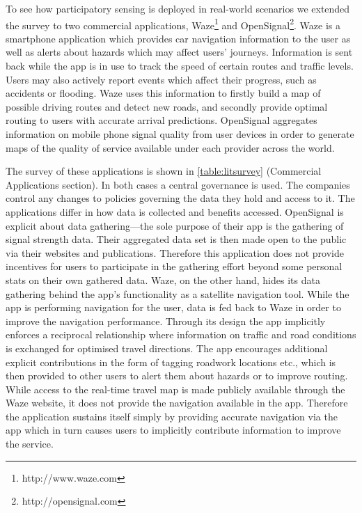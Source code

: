 To see how participatory sensing is deployed in real-world scenarios we extended the survey to two commercial applications, Waze\footnote{http://www.waze.com} and OpenSignal\footnote{http://opensignal.com}. Waze is a smartphone application which provides car navigation information to the user as well as alerts about hazards which may affect users' journeys. Information is sent back while the app is in use to track the speed of certain routes and traffic levels. Users may also actively report events which affect their progress, such as accidents or flooding. Waze uses this information to firstly build a map of possible driving routes and detect new roads, and secondly provide optimal routing to users with accurate arrival predictions. OpenSignal aggregates information on mobile phone signal quality from user devices in order to generate maps of the quality of service available under each provider across the world.

The survey of these applications is shown in \autoref{table:litsurvey} (Commercial Applications section). 
In both cases a central governance is used. The companies control any changes to policies governing the data they hold and access to it. The applications differ in how data is collected and benefits accessed. 
OpenSignal is explicit about data gathering---the sole purpose of their app is the gathering of signal strength data. 
Their aggregated data set is then made open to the public via their websites and publications. Therefore this application does not provide incentives for users to participate in the gathering effort beyond some personal stats on their own gathered data. Waze, on the other hand, hides its data gathering behind the app's functionality as a satellite navigation tool. 
While the app is performing navigation for the user, data is fed back to Waze in order to improve the navigation performance. 
Through its design the app implicitly enforces a reciprocal relationship where information on traffic and road conditions is exchanged for optimised travel directions. 
The app encourages additional explicit contributions in the form of tagging roadwork locations etc., which is then provided to other users to alert them about hazards or to improve routing. 
While access to the real-time travel map is made publicly available through the Waze website, it does not provide the navigation available in the app. Therefore the application sustains itself simply by providing accurate navigation via the app which in turn causes users to implicitly contribute information to improve the service.

